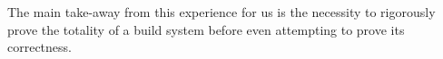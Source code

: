 \documentclass[sigplan,review]{acmart}\settopmatter{printfolios=true,printccs=false,printacmref=false}
\begin{document}
The main take-away from this experience for us is the necessity to rigorously
prove the totality of a build system before even attempting to prove its correctness.







\end{document}
